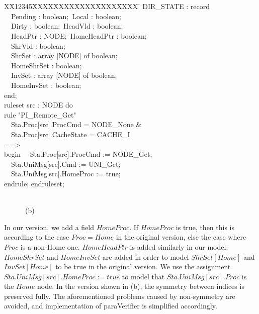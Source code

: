 \documentclass{llncs-new}
\newlength{\fminilength}
\newenvironment{fmini}[1][\linewidth]
  {\setlength{\fminilength}{#1\fboxsep-2\fboxrule}%
   \vspace{2ex}\noindent\begin{lrbox}{\fminibox}\begin{minipage}{\fminilength}%
   \mbox{ }\hfill\vspace{-2.5ex}}%
  {\end{minipage}\end{lrbox}\vspace{1ex}\hspace{0ex}%
   \framebox{\usebox{\fminibox}}}
\newenvironment{specification}
{\noindent\scriptsize
\tt\begin{fmini}\begin{tabbing}X\=X12345\=XXXX\=XXXX\=XXXX\=XXXX\=XXXX
\=\+\kill} {\end{tabbing}\normalfont\end{fmini}}
\def \twoSpaces {\ \ }
\def \twoSpaces {\ \ }
\begin{document}
{\begin{multicols}{2}
\begin{specification}
  DIR\_STATE : record\\
\indent \twoSpaces     Pending : boolean;\     Local : boolean;\\
\indent \twoSpaces     Dirty : boolean;\      HeadVld : boolean;\\
\indent \twoSpaces     HeadPtr : NODE;\      HomeHeadPtr : boolean;\\
\indent \twoSpaces     ShrVld : boolean;\\
\indent \twoSpaces     ShrSet : array [NODE] of boolean;\\
\indent \twoSpaces     HomeShrSet : boolean;\\
\indent \twoSpaces     InvSet : array [NODE] of boolean;\\
\indent \twoSpaces     HomeInvSet : boolean;\\
  end;\\

  ruleset src : NODE do\\
rule "PI\_Remote\_Get"\\
\indent \twoSpaces   Sta.Proc[src].ProcCmd = NODE\_None \&\\
\indent \twoSpaces   Sta.Proc[src].CacheState = CACHE\_I\\
==>\\
begin
\indent \twoSpaces   Sta.Proc[src].ProcCmd := NODE\_Get;\\
\indent \twoSpaces   Sta.UniMsg[src].Cmd := UNI\_Get;\\
\indent \twoSpaces   Sta.UniMsg[src].HomeProc := true;\\
endrule; endruleset;
\end{specification}\\
\twoSpaces \twoSpaces \twoSpaces \center(b)
\end{multicols}
}


\vspace{-10pt}

In our version, we add a field $HomeProc$. If $HomeProc$ is true, then this is according to the case $Proc=Home$ in the original version, else     the case where $Proc$ is a non-Home one. $HomeHeadPtr$ is added similarly in our model.  $HomeShrSet$  and     $HomeInvSet$ are added in order to model $ShrSet[Home]$ and $InvSet[Home]$ to be true in the original version. We use the assignment $Sta.UniMsg[src].HomeProc := true$ to  model   that $Sta.UniMsg[src].Proc$ is the $Home$ node. In the version shown in (b),  the symmetry between indices is preserved fully.  The aforementioned problems caused by non-symmetry are avoided, and implementation of {\sf paraVerifier} is simplified accordingly. %
\end{document}
